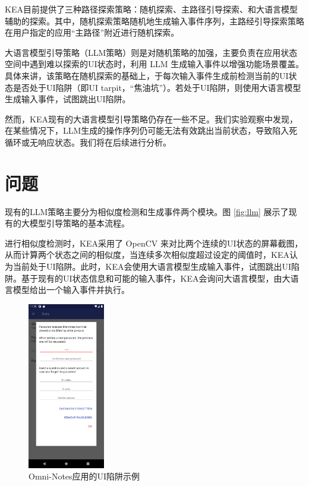 \documentclass[twocolumn, 10pt]{article}
\newcommand{\kea}{K{\small\MakeUppercase{ea}}}
\begin{document}
\kea 目前提供了三种路径探索策略：随机探索、主路径引导探索、和大语言模型辅助的探索。其中，随机探索策略随机地生成输入事件序列，主路经引导探索策略在用户指定的应用``主路径''附近进行随机探索。

大语言模型引导策略（LLM策略）则是对随机策略的加强，主要负责在应用状态空间中遇到难以探索的UI状态时，利用 LLM 生成输入事件以增强功能场景覆盖。具体来讲，该策略在随机探索的基础上，于每次输入事件生成前检测当前的UI状态是否处于UI陷阱（即UI tarpit，``焦油坑''\cite{khan2024aurora}）。若处于UI陷阱，则使用大语言模型生成输入事件，试图跳出UI陷阱。

然而，\kea 现有的大语言模型引导策略仍存在一些不足。我们实验观察中发现，在某些情况下，LLM生成的操作序列仍可能无法有效跳出当前状态，导致陷入死循环或无响应状态。我们将在后续进行分析。

\section{问题}

现有的LLM策略主要分为相似度检测和生成事件两个模块。图 \ref{fig:llm} 展示了现有的大模型引导策略的基本流程。

进行相似度检测时，\kea 采用了 OpenCV 来对比两个连续的UI状态的屏幕截图，从而计算两个状态之间的相似度，当连续多次相似度超过设定的阈值时，\kea 认为当前处于UI陷阱。此时，\kea 会使用大语言模型生成输入事件，试图跳出UI陷阱。基于现有的UI状态信息和可能的输入事件，\kea 会询问大语言模型，由大语言模型给出一个输入事件并执行。

\begin{figure}[t]
    \centering
    \includegraphics[width=0.3\textwidth]{1}
    \caption{Omni-Notes应用的UI陷阱示例}
    \label{fig:omni_tarpit}
\end{figure}
\end{document}

